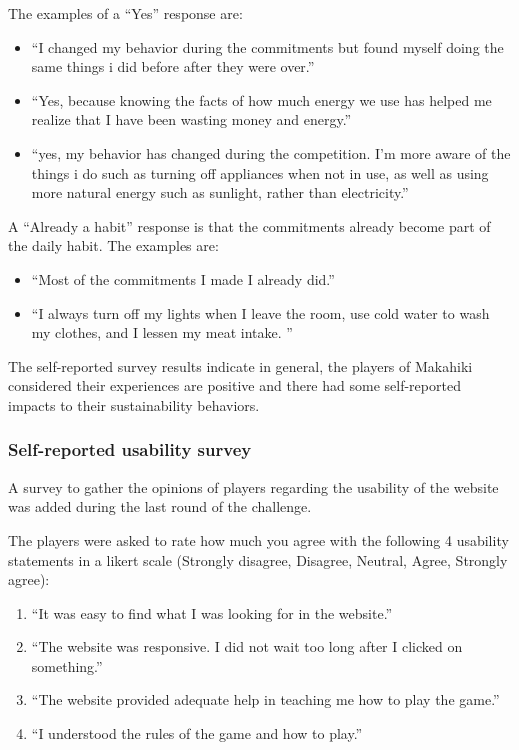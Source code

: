 The examples of a ``Yes'' response are:
\begin{itemize}
\item ``I changed my behavior during the commitments but found myself doing the same things i did before after they were over.''
\item ``Yes, because knowing the facts of how much energy we use has helped me realize that I have been wasting money and energy.''
\item ``yes, my behavior has changed during the competition. I'm more aware of the things i do such as turning off appliances when not in use, as well as using more natural energy such as sunlight, rather than electricity.''
\end{itemize}

A ``Already a habit'' response is that the commitments already become part of the daily habit. The examples are:
\begin{itemize}
\item ``Most of the commitments I made I already did.''
\item ``I always turn off my lights when I leave the room, use cold water to wash my clothes, and I lessen my meat intake. ''
\end{itemize}

The self-reported survey results indicate in general, the players of Makahiki considered their experiences are positive and there had some self-reported impacts to their sustainability behaviors. 

\subsubsection{Self-reported usability survey}

A survey to gather the opinions of players regarding the usability of the website was added during the last round of the challenge. 

The players were asked to rate how much you agree with the following 4 usability statements in a likert scale (Strongly disagree, Disagree, Neutral, Agree, Strongly agree):
\begin{enumerate}
\item ``It was easy to find what I was looking for in the website.''
\item ``The website was responsive. I did not wait too long after I clicked on something.''
\item ``The website provided adequate help in teaching me how to play the game.''
\item ``I understood the rules of the game and how to play.''
\end{enumerate}

